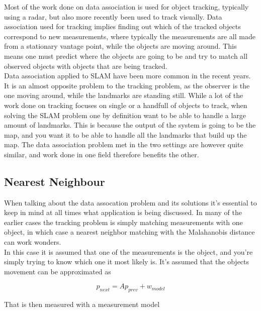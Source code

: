 Most of the work done on data association is used for object tracking, typically using a radar\cite{RadarTracking}, but also more recently been used to track visually\cite{VisualTracking}. Data association used for tracking implies finding out which of the tracked objects correspond to new measurements, where typically the measurements are all made from a stationary vantage point, while the objects are moving around. This means one must predict where the objects are going to be and try to match all observed objects with objects that are being tracked. \\

Data association applied to SLAM have been more common in the recent years. It is an almost opposite problem to the tracking problem, as the observer is the one moving around, while the landmarks are standing still. While a lot of the work done on tracking focuses on single or a handfull of objects to track, when solving the SLAM problem one by definition want to be able to handle a large amount of landmarks. This is because the output of the system is going to be the map, and you want it to be able to handle all the landmarks that build up the map. The data association problem met in the two settings are however quite similar, and work done in one field therefore benefits the other. \\

\subsection{Nearest Neighbour}

When talking about the data assocation problem and its solutions it's essential to keep in mind at all times what application is being discussed. In many of the earlier cases the tracking problem is simply matching measurements with one object, in which case a nearest neighbor matching with the Malahanobis distance can work wonders\cite{ShalomTracking}. \\ 

In this case it is assumed that one of the measurements is the object, and you're simply trying to know which one it most likely is. It's assumed that the objects movement can be approximated as

\begin{equation}
    p_{next} = Ap_{prev} + w_{model}
\end{equation}

That is then measured with a measurement model

